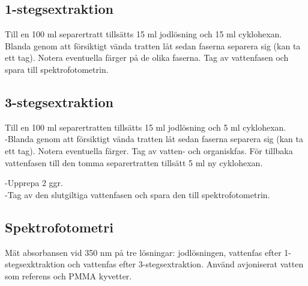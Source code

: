 \documentclass[./chem_exercises.tex]{subfiles}
\begin{document}
\subsection{1-stegsextraktion}
Till en 100 ml separertratt
tillsätts 15 ml jodlösning och 15 ml cyklohexan.
Blanda genom att försiktigt vända tratten låt sedan
faserna separera sig (kan ta ett tag). Notera
eventuella färger på de olika faserna. Tag av
vattenfasen och spara till spektrofotometrin.

\subsection{3-stegsextraktion}
Till en 100 ml separertratten
tillsätts 15 ml jodlösning och 5 ml cyklohexan. \\

-Blanda genom att försiktigt vända tratten låt sedan faserna separera sig (kan ta ett tag). Notera
eventuella färger. Tag av vatten- och organiskfas. För tillbaka vattenfasen till den tomma
separertratten tillsätt 5 ml ny cyklohexan. 

-Upprepa 2 ggr.\\

-Tag av den slutgiltiga vattenfasen och spara den till
spektrofotometrin.

\subsection{Spektrofotometri}
Mät absorbansen vid 350 nm på tre lösningar: jodlösningen,
vattenfas efter 1-stegsexktraktion och vattenfas efter 3-stegsextraktion. Använd avjoniserat
vatten som referens och PMMA kyvetter.
\end{document}
